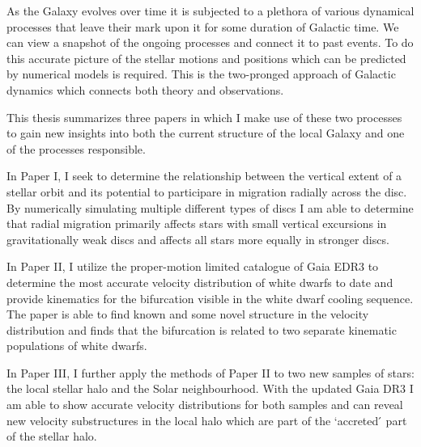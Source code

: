 
As the Galaxy evolves over time it is subjected to a plethora of various dynamical processes that leave their mark upon it for some duration of Galactic time. We can view a snapshot of the ongoing processes and connect it to past events. To do this accurate picture of the stellar motions and positions which can be predicted by numerical models is required. This is the two-pronged approach of Galactic dynamics which connects both theory and observations.

This thesis summarizes three papers in which I make use of these two processes to gain new insights into both the current structure of the local Galaxy and one of the processes responsible.

In Paper I, I seek to determine the relationship between the vertical extent of a stellar orbit and its potential to participare in migration radially across the disc. By numerically simulating multiple different types of discs I am able to determine that radial migration primarily affects stars with small vertical excursions in gravitationally weak discs and affects all stars more equally in stronger discs.

In Paper II, I utilize the proper-motion limited catalogue of Gaia EDR3 to determine the most accurate velocity distribution of white dwarfs to date and provide kinematics for the bifurcation visible in the white dwarf cooling sequence. The paper is able to find known and some novel structure in the velocity distribution and finds that the bifurcation is related to two separate kinematic populations of white dwarfs.

In Paper III, I further apply the methods of Paper II to two new samples of stars: the local stellar halo and the Solar neighbourhood. With the updated Gaia DR3 I am able to show accurate velocity distributions for both samples and can reveal new velocity substructures in the local halo which are part of the `accreted ́ part of the stellar halo.